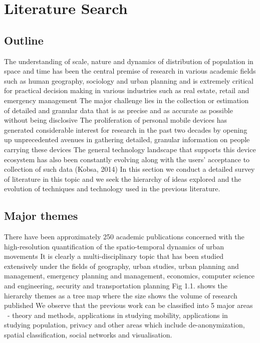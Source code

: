 \chapter{Literature Search}



\section{Outline}


The understanding of scale, nature and dynamics of distribution of population in space and time has been the central premise of research in various academic fields such as human geography, sociology and urban planning and is extremely critical for practical decision making in various industries such as real estate, retail and emergency management
The major challenge lies in the collection or estimation of detailed and granular data that is as precise and as accurate as possible without being disclosive
The proliferation of personal mobile devices has generated considerable interest for research in the past two decades by opening up unprecedented avenues in gathering detailed, granular information on people carrying these devices
The general technology landscape that supports this device ecosystem has also been constantly evolving along with the users’ acceptance to collection of such data (Kobsa, 2014)
In this section we conduct a detailed survey of literature in this topic and we seek the hierarchy of ideas explored and the evolution of techniques and technology used in the previous literature. 


\section{Major themes}


There have been approximately 250 academic publications concerned with the high-resolution quantification of the spatio-temporal dynamics of urban movements
It is clearly a multi-disciplinary topic that has been studied extensively under the fields of geography, urban studies, urban planning and management, emergency planning and management, economics, computer science and engineering, security and transportation planning
Fig 1.1. shows the hierarchy themes as a tree map where the size shows the volume of research published
We observe that the previous work can be classified into 5 major areas  - theory and methods, applications in studying mobility, applications in studying population, privacy and other areas which include de-anonymization, spatial classification, social networks and visualisation.

